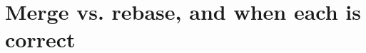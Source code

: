 \chapter{Merge vs. rebase, and when each is correct}
\label{ch:merge-vs-rebase-and-when-each-is-correct}

